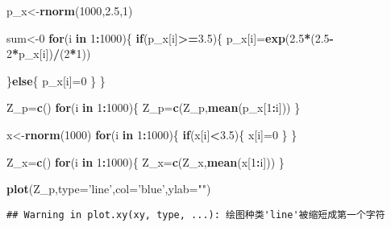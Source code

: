 \documentclass[]{article}
\newenvironment{Shaded}{\begin{snugshade}}{\end{snugshade}}
\newcommand{\KeywordTok}[1]{\textcolor[rgb]{0.13,0.29,0.53}{\textbf{#1}}}
\newcommand{\DataTypeTok}[1]{\textcolor[rgb]{0.13,0.29,0.53}{#1}}
\newcommand{\DecValTok}[1]{\textcolor[rgb]{0.00,0.00,0.81}{#1}}
\newcommand{\FloatTok}[1]{\textcolor[rgb]{0.00,0.00,0.81}{#1}}
\newcommand{\StringTok}[1]{\textcolor[rgb]{0.31,0.60,0.02}{#1}}
\newcommand{\ControlFlowTok}[1]{\textcolor[rgb]{0.13,0.29,0.53}{\textbf{#1}}}
\newcommand{\OperatorTok}[1]{\textcolor[rgb]{0.81,0.36,0.00}{\textbf{#1}}}
\newcommand{\NormalTok}[1]{#1}
\begin{document}
\begin{Shaded}
\begin{Highlighting}[]
\NormalTok{p_x<-}\KeywordTok{rnorm}\NormalTok{(}\DecValTok{1000}\NormalTok{,}\FloatTok{2.5}\NormalTok{,}\DecValTok{1}\NormalTok{)}

\NormalTok{sum<-}\DecValTok{0}
\ControlFlowTok{for}\NormalTok{(i }\ControlFlowTok{in} \DecValTok{1}\OperatorTok{:}\DecValTok{1000}\NormalTok{)\{}
  \ControlFlowTok{if}\NormalTok{(p_x[i]}\OperatorTok{>=}\FloatTok{3.5}\NormalTok{)\{}
\NormalTok{    p_x[i]=}\KeywordTok{exp}\NormalTok{(}\FloatTok{2.5}\OperatorTok{*}\NormalTok{(}\FloatTok{2.5}\OperatorTok{-}\DecValTok{2}\OperatorTok{*}\NormalTok{p_x[i])}\OperatorTok{/}\NormalTok{(}\DecValTok{2}\OperatorTok{*}\DecValTok{1}\NormalTok{))}
  
    
\NormalTok{  \}}\ControlFlowTok{else}\NormalTok{\{}
\NormalTok{    p_x[i]=}\DecValTok{0}
\NormalTok{  \}}
\NormalTok{\}}

\NormalTok{Z_p=}\KeywordTok{c}\NormalTok{()}
\ControlFlowTok{for}\NormalTok{(i }\ControlFlowTok{in} \DecValTok{1}\OperatorTok{:}\DecValTok{1000}\NormalTok{)\{}
\NormalTok{  Z_p=}\KeywordTok{c}\NormalTok{(Z_p,}\KeywordTok{mean}\NormalTok{(p_x[}\DecValTok{1}\OperatorTok{:}\NormalTok{i]))}
\NormalTok{\}}


\NormalTok{x<-}\KeywordTok{rnorm}\NormalTok{(}\DecValTok{1000}\NormalTok{)}
\ControlFlowTok{for}\NormalTok{(i }\ControlFlowTok{in} \DecValTok{1}\OperatorTok{:}\DecValTok{1000}\NormalTok{)\{}
  \ControlFlowTok{if}\NormalTok{(x[i]}\OperatorTok{<}\FloatTok{3.5}\NormalTok{)\{}
\NormalTok{    x[i]=}\DecValTok{0}
\NormalTok{  \}}
\NormalTok{\}}

\NormalTok{Z_x=}\KeywordTok{c}\NormalTok{()}
\ControlFlowTok{for}\NormalTok{(i }\ControlFlowTok{in} \DecValTok{1}\OperatorTok{:}\DecValTok{1000}\NormalTok{)\{}
\NormalTok{  Z_x=}\KeywordTok{c}\NormalTok{(Z_x,}\KeywordTok{mean}\NormalTok{(x[}\DecValTok{1}\OperatorTok{:}\NormalTok{i]))}
\NormalTok{\}}





\KeywordTok{plot}\NormalTok{(Z_p,}\DataTypeTok{type=}\StringTok{'line'}\NormalTok{,}\DataTypeTok{col=}\StringTok{'blue'}\NormalTok{,}\DataTypeTok{ylab=}\StringTok{""}\NormalTok{)}
\end{Highlighting}
\end{Shaded}

\begin{verbatim}
## Warning in plot.xy(xy, type, ...): 绘图种类'line'被缩短成第一个字符
\end{verbatim}
\end{document}
